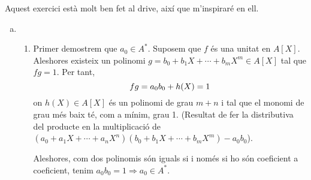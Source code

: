 \documentclass[../main.tex]{subfiles}
\begin{document}
\begin{sol}
Aquest exercici està molt ben fet al drive, així que m'inspiraré en ell.
\begin{enumerate}[(a)]
    \item \begin{enumerate}[($\Rightarrow$)]
        \item Primer demostrem que $a_0\in A^*$. Suposem que $f$ és una unitat en $A[X]$. Aleshores existeix un polinomi $g = b_0+b_1X+\cdots+b_mX^m\in A[X]$ tal que $fg=1$. Per tant,
        \begin{equation}
            \notag
            fg = a_0b_0+h(X) = 1
        \end{equation}
        on $h(X)\in A[X]$ és un polinomi de grau $m+n$ i tal que el monomi de grau més baix té, com a mínim, grau 1. (Resultat de fer la distributiva del producte en la multiplicació de $(a_0+a_1X+\cdots+a_nX^n)(b_0+b_1X+\cdots+b_mX^m)-a_0b_0$).
        
        Aleshores, com dos polinomis són iguals si i només si ho són coeficient a coeficient, tenim $a_0b_0 = 1\Rightarrow a_0\in A^*$.
        

\end{enumerate}
\end{enumerate}
\end{sol}
\end{document}
